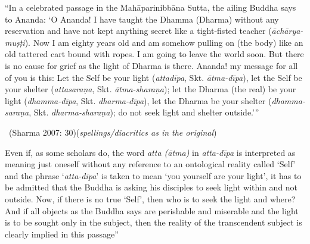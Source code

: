 \begin{myquote}
“In a celebrated passage in the Mahāparinibbāna Sutta, the ailing Buddha says to Ananda: ‘O Ananda! I have taught the Dhamma (Dharma) without any reservation and have not kept anything secret like a tight-fisted teacher (\textit{āchārya-muṣṭi}). Now I am eighty years old and am somehow pulling on (the body) like an old tattered cart bound with ropes. I am going to leave the world soon. But there is no cause for grief as the light of Dharma is there. Ananda! my message for all of you is this: Let the Self be your light (\textit{attadīpa}, Skt. \textit{ātma-dīpa}), let the Self be your shelter (\textit{attasaraṇa}, Skt. \textit{ātma-sharaṇa}); let the Dharma (the real) be your light (\textit{dhamma-dīpa}, Skt. \textit{dharma-dīpa}), let the Dharma be your shelter (\textit{dhamma-saraṇa}, Skt. \textit{dharma-sharaṇa}); do not seek light and shelter outside.’” 

~\hfill (Sharma 2007: 30)(\textit{spellings/diacritics as in the original})
\end{myquote}

Even if, as some scholars do, the word \textit{atta (ātma)} in \textit{atta-dīpa} is interpreted as meaning just oneself without any reference to an ontological reality called ‘Self’ and the phrase ‘\textit{atta-dīpa}’ is taken to mean ‘you yourself are your light’, it has to be admitted that the Buddha is asking his disciples to seek light within and not outside. Now, if there is no true ‘Self’, then who is to seek the light and where? And if all objects as the Buddha says are perishable and miserable and the light is to be sought only in the subject, then the reality of the transcendent subject is clearly implied in this passage”

